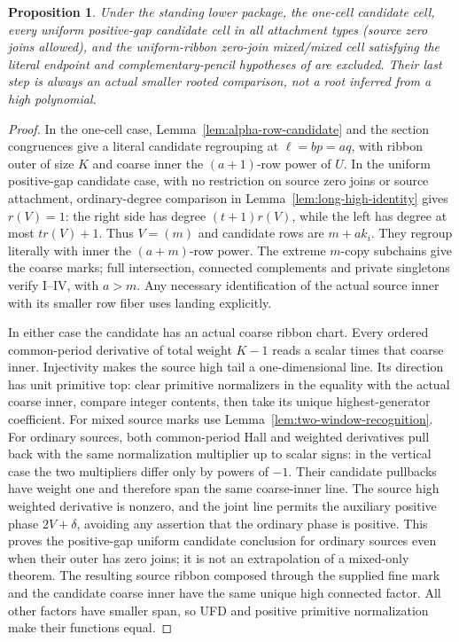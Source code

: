 \documentclass[11pt,a4paper]{amsart}
\numberwithin{equation}{section}
\theoremstyle{plain}
\newtheorem{proposition}[theorem]{Proposition}
\theoremstyle{definition}
\begin{document}
\begin{proposition}\label{prop:older-probe-consumers}
Under the standing lower package, the one-cell candidate cell, every uniform positive-gap candidate cell in all attachment types (source zero joins allowed), and the uniform-ribbon zero-join mixed/mixed cell satisfying the literal endpoint and complementary-pencil hypotheses of  are excluded.  Their last step is always an actual smaller rooted comparison, not a root inferred from a high polynomial.
\end{proposition}
\begin{proof}
In the one-cell case, Lemma~\ref{lem:alpha-row-candidate} and the section congruences give a literal candidate regrouping at \(\ell=bp=aq\), with ribbon outer of size \(K\) and coarse inner the \((a+1)\)-row power of \(U\).  In the uniform positive-gap candidate case, with no restriction on source zero joins or source attachment, ordinary-degree comparison in Lemma~\ref{lem:long-high-identity} gives \(r(V)=1\): the right side has degree \((t+1)r(V)\), while the left has degree at most \(tr(V)+1\).  Thus \(V=(m)\) and candidate rows are \(m+ak_i\).  They regroup literally with inner the \((a+m)\)-row power.  The extreme \(m\)-copy subchains give the coarse marks; full intersection, connected complements and private singletons verify I--IV, with \(a>m\).  Any necessary identification of the actual source inner with its smaller row fiber uses landing explicitly.

In either case the candidate has an actual coarse ribbon chart.  Every ordered common-period derivative of total weight \(K-1\) reads a scalar times that coarse inner.  Injectivity makes the source high tail a one-dimensional line.  Its direction has unit primitive top: clear primitive normalizers in the equality with the actual coarse inner, compare integer contents, then take its unique highest-generator coefficient.  For mixed source marks use Lemma~\ref{lem:two-window-recognition}.  For ordinary sources, both common-period Hall and weighted derivatives pull back with the same normalization multiplier up to scalar signs: in the vertical case the two multipliers differ only by powers of \(-1\).  Their candidate pullbacks have weight one and therefore span the same coarse-inner line.  The source high weighted derivative is nonzero, and the joint line permits the auxiliary positive phase \(2V+\delta\), avoiding any assertion that the ordinary phase is positive.  This proves the positive-gap uniform candidate conclusion for ordinary sources even when their outer has zero joins; it is not an extrapolation of a mixed-only theorem.  The resulting source ribbon composed through the supplied fine mark and the candidate coarse inner have the same unique high connected factor.  All other factors have smaller span, so UFD and positive primitive normalization make their functions equal.


\end{proof}
\end{document}
